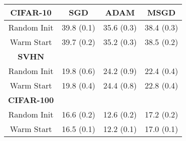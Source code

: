 \begin{tabular}{cccc}
\textbf{CIFAR-10}  & SGD     & ADAM    & MSGD \\ \hline
Random Init        & 39.8 (0.1) & 35.6 (0.3) & 38.4 (0.3)                  \\
Warm Start         & 39.7 (0.2) & 35.2 (0.3) & 38.5 (0.2)                  \\
\textbf{SVHN}      &         &         & \\\hline
Random Init        & 19.8 (0.6) & 24.2 (0.9) & 22.4 (0.4)                  \\
Warm Start         & 19.8 (0.4) & 24.4 (0.8) & 22.8 (0.4)                  \\
\textbf{CIFAR-100} &         &         & \\ \hline
Random Init        & 16.6 (0.2) & 12.6 (0.2) & 17.2 (0.2)                  \\
Warm Start         & 16.5 (0.1) & 12.2 (0.1) & 17.0 (0.1)   \\              
\end{tabular}